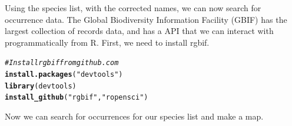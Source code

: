 \documentclass[letterpaper,superscriptaddress,showkeys,longbibliography]{revtex4-1}\usepackage[]{graphicx}\usepackage[]{color}
\makeatletter
\newcommand{\hlstr}[1]{\textcolor[rgb]{0.192,0.494,0.8}{#1}}%
\newcommand{\hlcom}[1]{\textcolor[rgb]{0.678,0.584,0.686}{\textit{#1}}}%
\newcommand{\hlstd}[1]{\textcolor[rgb]{0.345,0.345,0.345}{#1}}%
\newcommand{\hlkwd}[1]{\textcolor[rgb]{0.737,0.353,0.396}{\textbf{#1}}}%
\newenvironment{kframe}{%
 \def\at@end@of@kframe{}%
 \ifinner\ifhmode%
  \def\at@end@of@kframe{\end{minipage}}%
  \begin{minipage}{\columnwidth}%
 \fi\fi%
 \def\FrameCommand##1{\hskip\@totalleftmargin \hskip-\fboxsep
 \colorbox{shadecolor}{##1}\hskip-\fboxsep
     \hskip-\linewidth \hskip-\@totalleftmargin \hskip\columnwidth}%
 \MakeFramed {\advance\hsize-\width
   \@totalleftmargin\z@ \linewidth\hsize
   \@setminipage}}%
 {\par\unskip\endMakeFramed%
 \at@end@of@kframe}
\newenvironment{knitrout}{}{} %
\makeatother
\begin{document}

Using the species list, with the corrected names, we can now search for occurrence data. The Global Biodiversity Information Facility (GBIF) has the largest collection of records data, and has a  API that we can interact with programmatically from R. First, we need to install rgbif.

\begin{knitrout}
\color{fgcolor}\begin{kframe}
\begin{alltt}
\hlcom{# Install rgbif from github.com}
\hlkwd{install.packages}\hlstd{(}\hlstr{"devtools"}\hlstd{)}
\hlkwd{library}\hlstd{(devtools)}
\hlkwd{install_github}\hlstd{(}\hlstr{"rgbif"}\hlstd{,} \hlstr{"ropensci"}\hlstd{)}
\end{alltt}
\end{kframe}
\end{knitrout}


Now we can search for occurrences for our species list and make a map.
\end{document}
